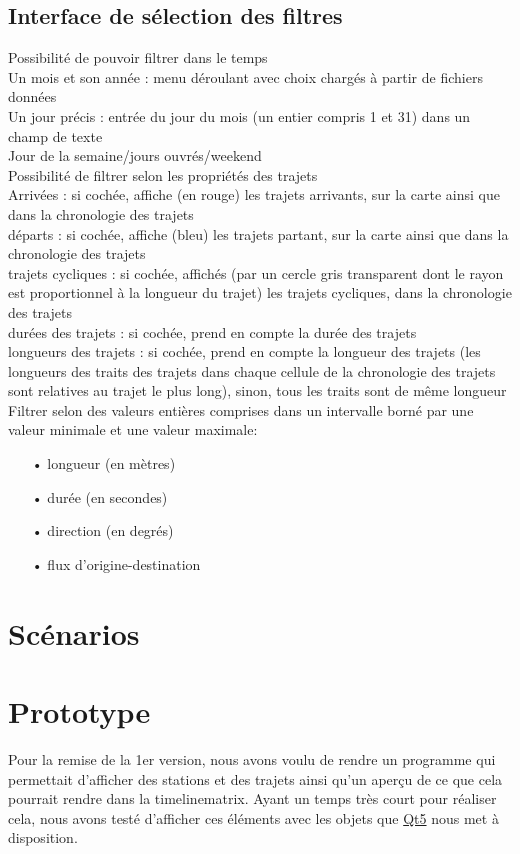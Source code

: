 \documentclass[12pt]{article}
\begin{document}
		\subsection{Interface de sélection des filtres}
		Possibilité de pouvoir filtrer dans le temps\\
		Un mois et son année : menu déroulant avec choix chargés à partir de fichiers
		données\\
		Un jour précis : entrée du jour du mois (un entier compris 1 et 31) dans un champ
		de texte\\
		Jour de la semaine/jours ouvrés/weekend\\
		Possibilité de filtrer selon les propriétés des trajets\\
		Arrivées : si cochée, affiche (en rouge) les trajets arrivants, sur la carte ainsi
		que dans la chronologie des trajets\\
		départs : si cochée, affiche (bleu) les trajets partant, sur la carte ainsi que
		dans la chronologie des trajets\\
		trajets cycliques : si cochée, affichés (par un cercle gris transparent dont le
		rayon est proportionnel à la longueur du trajet) les trajets cycliques, dans la
		chronologie des trajets\\
		durées des trajets : si cochée, prend en compte la durée des trajets\\
		longueurs des trajets : si cochée, prend en compte la longueur des trajets
		(les longueurs des traits des trajets dans chaque cellule de la chronologie des
		trajets sont relatives au trajet le plus long), sinon, tous les traits sont
		de même longueur\\
		
		Filtrer selon des valeurs entières comprises dans un intervalle borné par une
		valeur minimale et une valeur maximale:
		\begin{itemize}
			\item[•]longueur (en mètres)
			\item[•]durée (en secondes)
			\item[•]direction (en degrés)
			\item[•]flux d’origine-destination
		\end{itemize}
	
	\section{Scénarios}
	
	\section{Prototype}
	Pour la remise de la 1er version, nous avons voulu de rendre un programme qui permettait
	d'afficher des stations et des trajets ainsi qu'un aperçu de ce que cela pourrait rendre
	dans la timelinematrix. Ayant un temps très court pour réaliser cela, nous avons testé
	d'afficher ces éléments avec les objets que \href{https://www.qt.io/}{Qt5}
	nous met à disposition.\\
	
\end{document}
